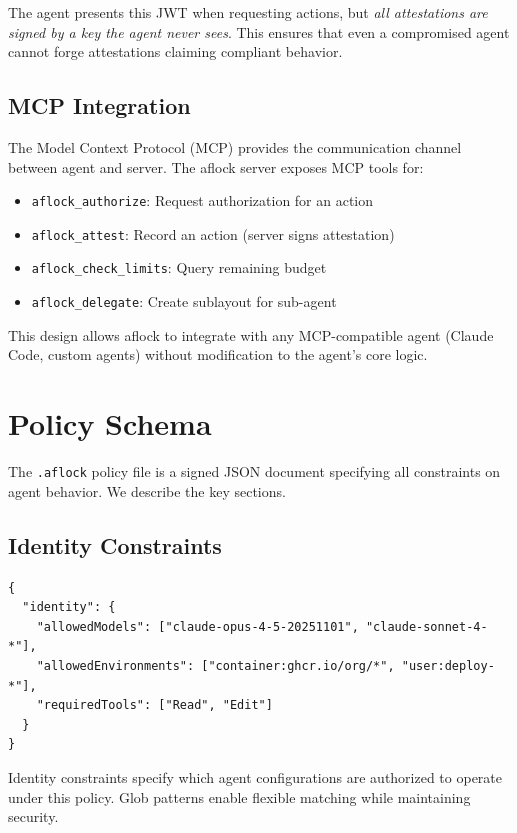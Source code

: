 \documentclass[11pt,a4paper]{article}
\begin{document}
The agent presents this JWT when requesting actions, but \textit{all attestations are signed by a key the agent never sees}. This ensures that even a compromised agent cannot forge attestations claiming compliant behavior.

\subsection{MCP Integration}

The Model Context Protocol (MCP) provides the communication channel between agent and server. The aflock server exposes MCP tools for:

\begin{itemize}[noitemsep]
    \item \texttt{aflock\_authorize}: Request authorization for an action
    \item \texttt{aflock\_attest}: Record an action (server signs attestation)
    \item \texttt{aflock\_check\_limits}: Query remaining budget
    \item \texttt{aflock\_delegate}: Create sublayout for sub-agent
\end{itemize}

This design allows aflock to integrate with any MCP-compatible agent (Claude Code, custom agents) without modification to the agent's core logic.

\section{Policy Schema}

The \texttt{.aflock} policy file is a signed JSON document specifying all constraints on agent behavior. We describe the key sections.

\subsection{Identity Constraints}

\begin{lstlisting}[style=json]
{
  "identity": {
    "allowedModels": ["claude-opus-4-5-20251101", "claude-sonnet-4-*"],
    "allowedEnvironments": ["container:ghcr.io/org/*", "user:deploy-*"],
    "requiredTools": ["Read", "Edit"]
  }
}
\end{lstlisting}

Identity constraints specify which agent configurations are authorized to operate under this policy. Glob patterns enable flexible matching while maintaining security.
\end{document}
